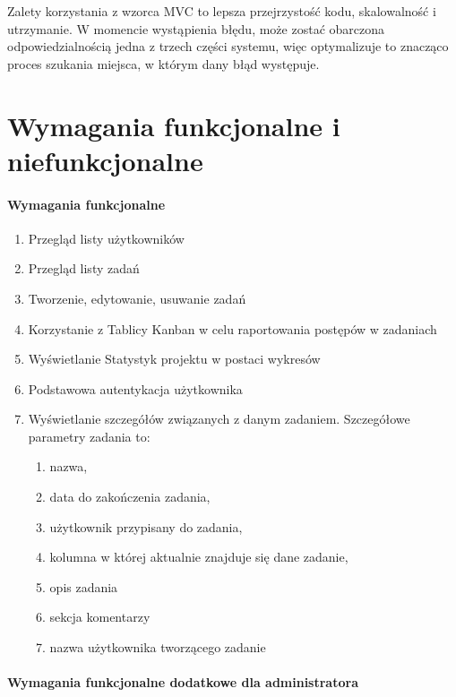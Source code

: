 Zalety korzystania z wzorca MVC to lepsza przejrzystość kodu, skalowalność i utrzymanie. W
momencie wystąpienia błędu, może zostać obarczona odpowiedzialnością jedna z trzech części
systemu, więc optymalizuje to znacząco proces szukania miejsca, w którym dany błąd
występuje.  
\clearpage
\section{Wymagania funkcjonalne i niefunkcjonalne}
\paragraph{Wymagania funkcjonalne}
\begin{enumerate}
	\item Przegląd listy użytkowników
	\item Przegląd listy zadań 
	\item Tworzenie, edytowanie, usuwanie zadań
	\item Korzystanie z Tablicy Kanban w celu raportowania postępów w zadaniach
	\item Wyświetlanie Statystyk projektu w postaci wykresów
	\item Podstawowa autentykacja użytkownika
	\item Wyświetlanie szczegółów związanych z danym zadaniem. Szczegółowe parametry zadania to:
	\begin{enumerate}[leftmargin=3em]
		\item nazwa,
		\item data do zakończenia zadania,
		\item użytkownik przypisany do zadania, 
		\item kolumna w której aktualnie znajduje się dane zadanie,
		\item opis zadania
		\item sekcja komentarzy
		\item nazwa użytkownika tworzącego zadanie
	\end{enumerate}
\end{enumerate}
\paragraph{Wymagania funkcjonalne dodatkowe dla administratora}

